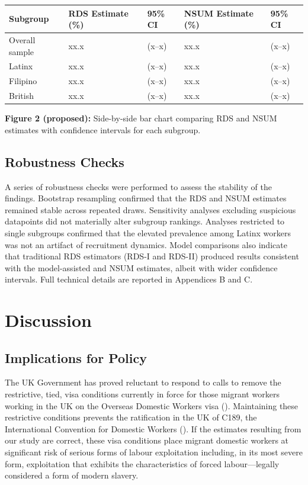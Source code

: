 \documentclass[
  12pt,
  letterpaper,
  DIV=11,
  numbers=noendperiod]{scrartcl}
\theoremstyle{plain}
\theoremstyle{definition}
\begin{document}
\begin{longtable}[]{@{}lllll@{}}
\toprule\noalign{}
Subgroup & RDS Estimate (\%) & 95\% CI & NSUM Estimate (\%) & 95\% CI \\
\midrule\noalign{}
\endhead
\bottomrule\noalign{}
\endlastfoot
Overall sample & xx.x & (x--x) & xx.x & (x--x) \\
Latinx & xx.x & (x--x) & xx.x & (x--x) \\
Filipino & xx.x & (x--x) & xx.x & (x--x) \\
British & xx.x & (x--x) & xx.x & (x--x) \\
\end{longtable}

\textbf{Figure 2 (proposed):} Side-by-side bar chart comparing RDS and
NSUM estimates with confidence intervals for each subgroup.

\subsection{Robustness Checks}\label{robustness-checks}

A series of robustness checks were performed to assess the stability of
the findings. Bootstrap resampling confirmed that the RDS and NSUM
estimates remained stable across repeated draws. Sensitivity analyses
excluding suspicious datapoints did not materially alter subgroup
rankings. Analyses restricted to single subgroups confirmed that the
elevated prevalence among Latinx workers was not an artifact of
recruitment dynamics. Model comparisons also indicate that traditional
RDS estimators (RDS-I and RDS-II) produced results consistent with the
model-assisted and NSUM estimates, albeit with wider confidence
intervals. Full technical details are reported in Appendices B and C.

\section{Discussion}\label{discussion}

\subsection{Implications for Policy}\label{implications-for-policy}

The UK Government has proved reluctant to respond to calls to remove the
restrictive, tied, visa conditions currently in force for those migrant
workers working in the UK on the Overseas Domestic Workers visa
(\textcite{gower_calls_2016}). Maintaining these restrictive conditions
prevents the ratification in the UK of C189, the International
Convention for Domestic Workers (\textcite{ILO11-indicators}). If the
estimates resulting from our study are correct, these visa conditions
place migrant domestic workers at significant risk of serious forms of
labour exploitation including, in its most severe form, exploitation
that exhibits the characteristics of forced labour---legally considered
a form of modern slavery.
\end{document}
